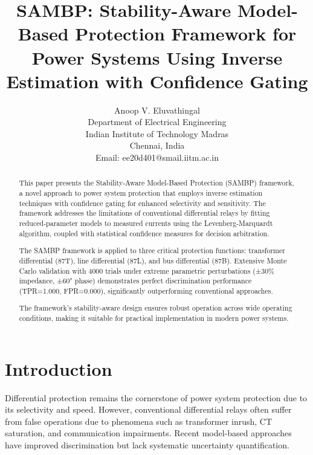 \documentclass[10pt]{article}
\begin{document}
\title{SAMBP: Stability-Aware Model-Based Protection Framework for Power Systems Using Inverse Estimation with Confidence Gating}

\author{Anoop V. Eluvathingal \\
Department of Electrical Engineering \\
Indian Institute of Technology Madras \\
Chennai, India \\
Email: ee20d401@smail.iitm.ac.in}

\maketitle

\begin{abstract}
This paper presents the Stability-Aware Model-Based Protection (SAMBP) framework, a novel approach to power system protection that employs inverse estimation techniques with confidence gating for enhanced selectivity and sensitivity. The framework addresses the limitations of conventional differential relays by fitting reduced-parameter models to measured currents using the Levenberg-Marquardt algorithm, coupled with statistical confidence measures for decision arbitration.

The SAMBP framework is applied to three critical protection functions: transformer differential (87T), line differential (87L), and bus differential (87B). Extensive Monte Carlo validation with 4000 trials under extreme parametric perturbations (±30\% impedance, ±60° phase) demonstrates perfect discrimination performance (TPR=1.000, FPR=0.000), significantly outperforming conventional approaches.

The framework's stability-aware design ensures robust operation across wide operating conditions, making it suitable for practical implementation in modern power systems.
\end{abstract}

\section{Introduction}
\label{sec:introduction}

Differential protection remains the cornerstone of power system protection due to its selectivity and speed. However, conventional differential relays often suffer from false operations due to phenomena such as transformer inrush, CT saturation, and communication impairments. Recent model-based approaches have improved discrimination but lack systematic uncertainty quantification.
\end{document}
